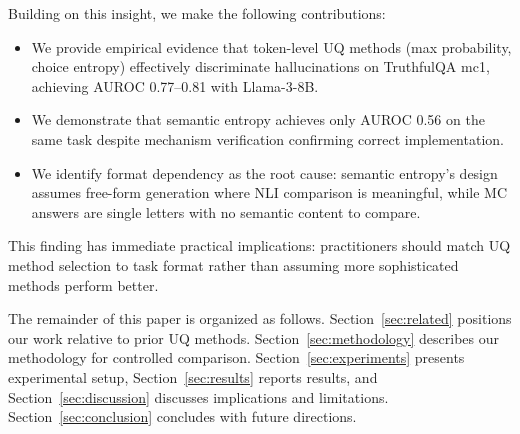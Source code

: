 Building on this insight, we make the following contributions:
\begin{itemize}
    \item We provide empirical evidence that token-level UQ methods (max probability, choice entropy) effectively discriminate hallucinations on TruthfulQA mc1, achieving AUROC 0.77--0.81 with Llama-3-8B.
    \item We demonstrate that semantic entropy achieves only AUROC 0.56 on the same task despite mechanism verification confirming correct implementation.
    \item We identify format dependency as the root cause: semantic entropy's design assumes free-form generation where NLI comparison is meaningful, while MC answers are single letters with no semantic content to compare.
\end{itemize}

This finding has immediate practical implications: practitioners should match UQ method selection to task format rather than assuming more sophisticated methods perform better.

The remainder of this paper is organized as follows. Section~\ref{sec:related} positions our work relative to prior UQ methods. Section~\ref{sec:methodology} describes our methodology for controlled comparison. Section~\ref{sec:experiments} presents experimental setup, Section~\ref{sec:results} reports results, and Section~\ref{sec:discussion} discusses implications and limitations. Section~\ref{sec:conclusion} concludes with future directions.
